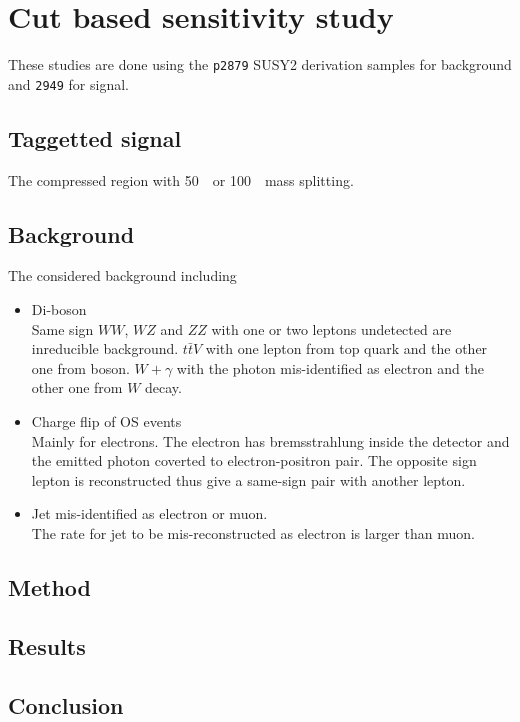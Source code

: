 \clearpage
\section{Cut based sensitivity study}
These studies are done using the \verb+p2879+ SUSY2 derivation samples for background and \verb+2949+ for signal.

\subsection{Taggetted signal}
The compressed region with 50~\GeV\ or 100~\GeV\ mass splitting.

\subsection{Background}
The considered background including
\begin{itemize}
  \item Di-boson\\
    Same sign $WW$, $WZ$ and $ZZ$ with one or two leptons undetected are inreducible background. $t\bar{t}V$ with one lepton from top quark and the other one from boson. $W+\gamma$ with the photon mis-identified as electron and the other one from $W$ decay.
  \item Charge flip of OS events\\
    Mainly for electrons. The electron has bremsstrahlung inside the detector and the emitted photon coverted to electron-positron pair. The opposite sign lepton is reconstructed thus give a same-sign pair with another lepton.
  \item Jet mis-identified as electron or muon.\\
    The rate for jet to be mis-reconstructed as electron is larger than muon.
\end{itemize}

\subsection{Method}

\subsection{Results}

\subsection{Conclusion}

